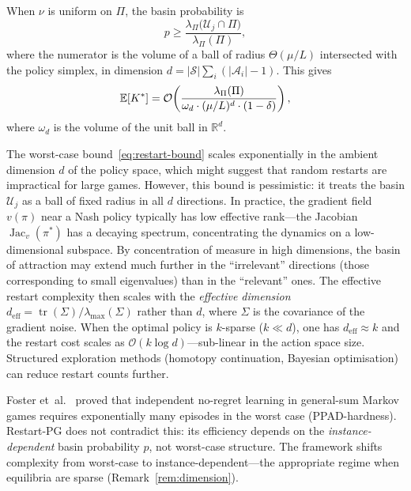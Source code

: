 \documentclass[a4paper,oneside,11pt]{report}
\newcommand{\R}{\mathbb{R}}
\newcommand{\calS}{\mathcal{S}}
\newcommand{\calA}{\mathcal{A}}
\newcommand{\calU}{\mathcal{U}}
\numberwithin{theorem}{chapter}
\numberwithin{equation}{chapter}
\begin{document}
When $\nu$ is uniform on $\Pi$, the basin probability is
\begin{equation}
  \label{eq:basin-volume}
  p \ge \frac{\lambda_\Pi\bigl(\calU_j \cap \Pi\bigr)}
  {\lambda_\Pi(\Pi)},
\end{equation}
where the numerator is the volume of a ball of radius
$\Theta(\mu/L)$ intersected with the policy simplex, in dimension
$d = |\calS| \sum_i (|\calA_i| - 1)$. This gives
\begin{equation}
  \label{eq:restart-bound}
  \mathbb{E}[K^*] = \mathcal{O}\!\left(
    \frac{\lambda_\Pi(\Pi)}{\omega_d \cdot (\mu/L)^d \cdot (1-\delta)}
  \right),
\end{equation}
where $\omega_d$ is the volume of the unit ball in $\R^d$.

\begin{remark}
  \label{rem:dimension}
  The worst-case bound~\eqref{eq:restart-bound} scales exponentially in
  the ambient dimension $d$ of the policy space, which might suggest
  that random restarts are impractical for large games. However, this
  bound is pessimistic: it treats the basin $\calU_j$ as a ball of
  fixed radius in all $d$ directions. In practice, the gradient field
  $v(\pi)$ near a Nash policy typically has low effective rank---the
  Jacobian $\operatorname{Jac}_v(\pi^*)$ has a decaying spectrum,
  concentrating the dynamics on a low-dimensional subspace. By
  concentration of measure in high dimensions, the basin of attraction
  may extend much further in the ``irrelevant'' directions (those
  corresponding to small eigenvalues) than in the ``relevant'' ones.
  The effective restart complexity then scales with the
  \emph{effective dimension}
  $d_{\mathrm{eff}} = \operatorname{tr}(\Sigma)/\lambda_{\max}(\Sigma)$
  rather than $d$, where $\Sigma$ is the covariance of the gradient
  noise. When the optimal policy is $k$-sparse ($k \ll d$), one has
  $d_{\mathrm{eff}} \approx k$ and the restart cost scales as
  $\mathcal{O}(k \log d)$---sub-linear in the action space size.
  Structured exploration methods (homotopy continuation, Bayesian
  optimisation) can reduce restart counts further.
\end{remark}

\begin{remark}
  \label{rem:ppad}
  Foster et~al.~\cite{foster2023} proved that independent no-regret
  learning in general-sum Markov games requires exponentially many
  episodes in the worst case (PPAD-hardness). Restart-PG does not
  contradict this: its efficiency depends on the
  \emph{instance-dependent} basin probability $p$, not worst-case
  structure. The framework shifts complexity from worst-case to
  instance-dependent---the appropriate regime when equilibria are
  sparse (Remark~\ref{rem:dimension}).
\end{remark}
\end{document}
